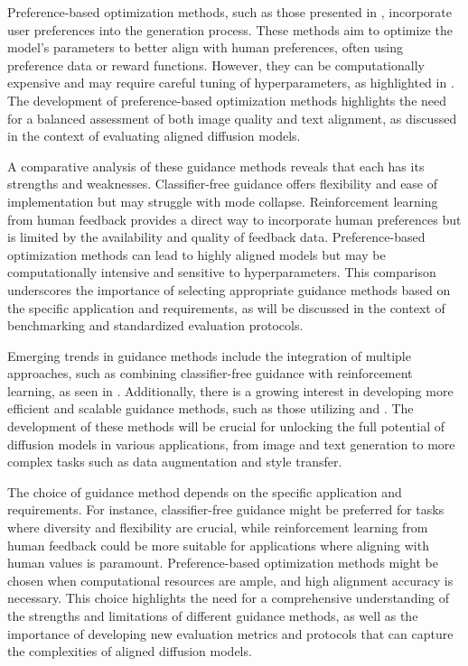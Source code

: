 \documentclass[11pt,a4paper]{article}
\begin{document}
Preference-based optimization methods, such as those presented in \cite{doi:10.1145/3631116}, incorporate user preferences into the generation process. These methods aim to optimize the model's parameters to better align with human preferences, often using preference data or reward functions. However, they can be computationally expensive and may require careful tuning of hyperparameters, as highlighted in \cite{doi:10.1109/tkde.2024.3361474}. The development of preference-based optimization methods highlights the need for a balanced assessment of both image quality and text alignment, as discussed in the context of evaluating aligned diffusion models.

A comparative analysis of these guidance methods reveals that each has its strengths and weaknesses. Classifier-free guidance offers flexibility and ease of implementation but may struggle with mode collapse. Reinforcement learning from human feedback provides a direct way to incorporate human preferences but is limited by the availability and quality of feedback data. Preference-based optimization methods can lead to highly aligned models but may be computationally intensive and sensitive to hyperparameters. This comparison underscores the importance of selecting appropriate guidance methods based on the specific application and requirements, as will be discussed in the context of benchmarking and standardized evaluation protocols.

Emerging trends in guidance methods include the integration of multiple approaches, such as combining classifier-free guidance with reinforcement learning, as seen in \cite{doi:10.1007/978-3-031-72970-6_2}. Additionally, there is a growing interest in developing more efficient and scalable guidance methods, such as those utilizing \cite{arxiv:2502.06805} and \cite{arxiv:2501.06848}. The development of these methods will be crucial for unlocking the full potential of diffusion models in various applications, from image and text generation to more complex tasks such as data augmentation and style transfer.

The choice of guidance method depends on the specific application and requirements. For instance, classifier-free guidance might be preferred for tasks where diversity and flexibility are crucial, while reinforcement learning from human feedback could be more suitable for applications where aligning with human values is paramount. Preference-based optimization methods might be chosen when computational resources are ample, and high alignment accuracy is necessary. This choice highlights the need for a comprehensive understanding of the strengths and limitations of different guidance methods, as well as the importance of developing new evaluation metrics and protocols that can capture the complexities of aligned diffusion models.
\end{document}

